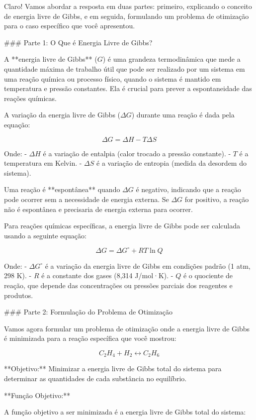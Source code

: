 Claro! Vamos abordar a resposta em duas partes: primeiro, explicando o conceito de energia livre de Gibbs, e em seguida, formulando um problema de otimização para o caso específico que você apresentou.

### Parte 1: O Que é Energia Livre de Gibbs?

A **energia livre de Gibbs** (\(G\)) é uma grandeza termodinâmica que mede a quantidade máxima de trabalho útil que pode ser realizado por um sistema em uma reação química ou processo físico, quando o sistema é mantido em temperatura e pressão constantes. Ela é crucial para prever a espontaneidade das reações químicas.

A variação da energia livre de Gibbs (\(\Delta G\)) durante uma reação é dada pela equação:

\[
\Delta G = \Delta H - T\Delta S
\]

Onde:
- \(\Delta H\) é a variação de entalpia (calor trocado a pressão constante).
- \(T\) é a temperatura em Kelvin.
- \(\Delta S\) é a variação de entropia (medida da desordem do sistema).

Uma reação é **espontânea** quando \(\Delta G\) é negativo, indicando que a reação pode ocorrer sem a necessidade de energia externa. Se \(\Delta G\) for positivo, a reação não é espontânea e precisaria de energia externa para ocorrer.

Para reações químicas específicas, a energia livre de Gibbs pode ser calculada usando a seguinte equação:

\[
\Delta G = \Delta G^\circ + RT \ln Q
\]

Onde:
- \(\Delta G^\circ\) é a variação da energia livre de Gibbs em condições padrão (1 atm, 298 K).
- \(R\) é a constante dos gases (8,314 J/mol·K).
- \(Q\) é o quociente de reação, que depende das concentrações ou pressões parciais dos reagentes e produtos.

### Parte 2: Formulação do Problema de Otimização

Vamos agora formular um problema de otimização onde a energia livre de Gibbs é minimizada para a reação específica que você mostrou:

\[ C_2H_4 + H_2 \leftrightarrow C_2H_6 \]

**Objetivo:**
Minimizar a energia livre de Gibbs total do sistema para determinar as quantidades de cada substância no equilíbrio.

**Função Objetivo:**

A função objetivo a ser minimizada é a energia livre de Gibbs total do sistema:

